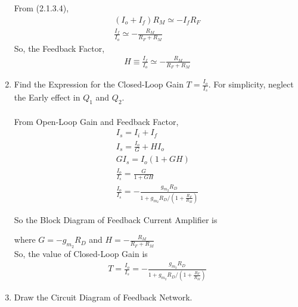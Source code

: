 \begin{enumerate}[label=\thesubsection.\arabic*.,ref=\thesubsection.\theenumi]
From (2.1.3.4),
\begin{align}
(I_{o} + I_{f})R_{M} \simeq -I_{f}R_{F}\\
\frac{I_{f}}{I_{o}} \simeq -\frac{R_{M}}{R_{F}+R_{M}}
\end{align}
So, the Feedback Factor,
\begin{align}
H \equiv \frac{I_{f}}{I_{o}} \simeq-\frac{R_{M}}{R_{F}+R_{M}}
\end{align}
\item Find the Expression for the Closed-Loop Gain $T=\frac{I_{o}}{I_{s}}$. For simplicity, neglect the Early effect in $Q_{1}$ and $Q_{2}$.\\
\solution \\
From Open-Loop Gain and Feedback Factor,
\begin{align}
I_{s} = I_{i} + I_{f}\\
I_{s} = \frac{I_{o}}{G} + H I_{o}\\
GI_{s} = I_{o}(1+GH)\\
\frac{I_{o}}{I_{s}} = \frac{G}{1+GH}\\
\frac{I_{o}}{I_{s}}=-\frac{g_{m_{2}} R_{D}}{1+g_{m_{2}} R_{D} /\left(1+\frac{R_{F}}{R_{M}}\right)}
\end{align}

So the Block Diagram of Feedback Current Amplifier is
\begin{figure}[ht!]
	\begin{center}
		\resizebox{\columnwidth}{!}{}
	\end{center}
	\caption{}
	\label{fig:Control_System}
\end{figure}

where $G = -g_{m_{2}} R_{D}$ and $H = -\frac{R_{M}}{R_{F}+R_{M}}$\\

So, the value of Closed-Loop Gain is
\begin{align}
T = \frac{I_{o}}{I_{s}}=-\frac{g_{m_{2}} R_{D}}{1+g_{m_{2}} R_{D} /\left(1+\frac{R_{F}}{R_{M}}\right)}
\end{align}

\item Draw the Circuit Diagram of Feedback Network.\\
\solution
\begin{figure}[ht!]
	\begin{center}
		\resizebox{\columnwidth/2}{!}{}
	\end{center}
	\caption{}
	\label{fig:Control_System}
\end{figure}


\end{enumerate}
